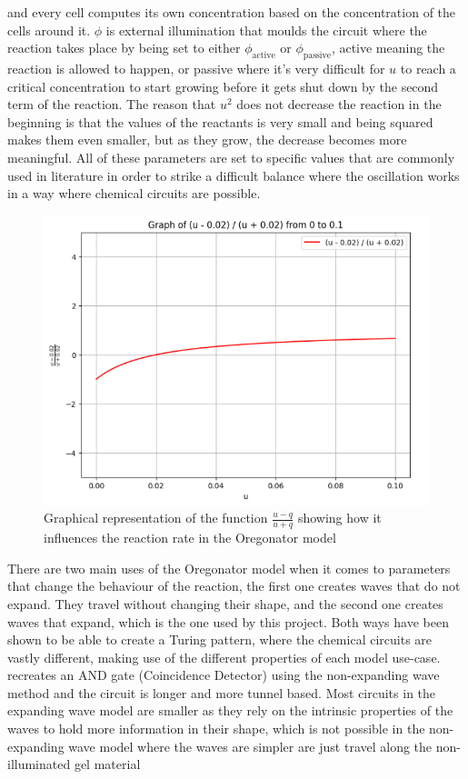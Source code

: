 and every cell computes its own concentration based on the concentration of the cells around it. 
$\phi$ is external illumination that moulds the circuit where the reaction takes place by being set to either $\phi_{\text{active}}$ or $\phi_{\text{passive}}$, 
active meaning the reaction is allowed to happen, or passive where it's very difficult for $u$ to reach a critical concentration to start growing before it gets shut down by the second term of the reaction.
The reason that $u^2$ does not decrease the reaction in the beginning is that the values of the reactants is very small and being squared makes them even smaller, but as they grow, the decrease becomes more meaningful.
All of these parameters are set to specific values that are commonly used in literature in order to strike a difficult balance where the oscillation works in a way where chemical circuits are possible. 

\begin{figure}
    \centering
    \includegraphics[width=0.75\linewidth]{images/Screenshot 2024-03-18 at 19.13.44.png}
    \caption{Graphical representation of the function $\frac{u - q}{u + q}$ showing how it influences the reaction rate in the Oregonator model}
    \label{fig:u-q_u+q-graph}
\end{figure}



There are two main uses of the Oregonator model when it comes to parameters that change the behaviour of the reaction, the first one creates waves that do not expand. 
They travel without changing their shape, and the second one creates waves that expand, which is the one used by this project.
Both ways have been shown to be able to create a Turing pattern, where the chemical circuits are vastly different, making use of the different properties of each model use-case.
\cite{stone2008coevolving} recreates an AND gate (Coincidence Detector) using the non-expanding wave method and the circuit is longer and more tunnel based. 
Most circuits in the expanding wave model are smaller as they rely on the intrinsic properties of the waves to hold more information in their shape, 
which is not possible in the non-expanding wave model where the waves are simpler are just travel along the non-illuminated gel material

